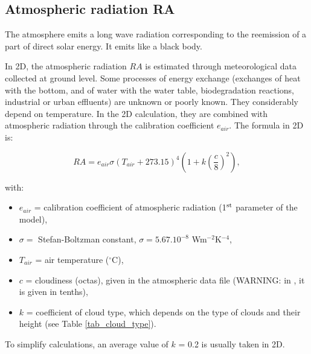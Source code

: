 \subsection{Atmospheric radiation RA}

The atmosphere emits a long wave radiation corresponding to the reemission of a
part of direct solar energy. It emits like a black body.

In 2D, the atmospheric radiation $RA$ is estimated through meteorological data collected at ground level.
Some processes of energy exchange (exchanges of heat with the bottom,
and of water with the water table, biodegradation reactions,
industrial or urban effluents) are unknown or poorly known.
They considerably depend on temperature.
In the 2D calculation, they are combined with atmospheric radiation
through the calibration coefficient $e_{air}$. The formula in 2D is:

\begin{equation}
  RA = e_{air} \sigma (T_{air} + 273.15 )^4 \left( 1+k\left( \frac{c}{8} \right) ^2 \right),
\end{equation}

with:
\begin{itemize}
  \item $e_{air}$ = calibration coefficient of atmospheric radiation (1$^{\rm{st}}$ parameter of the model),
  \item $\sigma = $ Stefan-Boltzman constant, $\sigma = 5.67.10^{-8}$ Wm$^{-2}$K$^{-4}$,
  \item $T_{air}$ = air temperature ($^{\circ}$C),
  \item $c$ = cloudiness (octas), given in the atmospheric data file
(WARNING: in \khione, it is given in tenths),
  \item $k$ = coefficient of cloud type, which depends on the type of clouds and their height
    (see Table \ref{tab_cloud_type}).
\end{itemize}
To simplify calculations, an average value of $k$ = 0.2 is usually taken in 2D.\\

